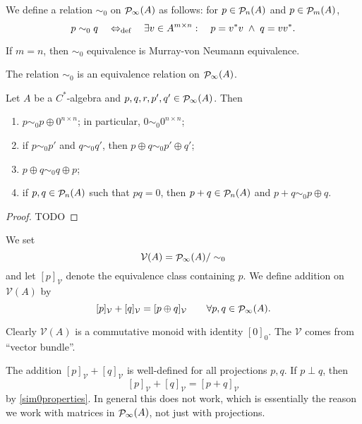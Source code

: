 \begin{definition}
We define a relation $\sim_0$ on $\mathop{\mathcal{P}}\nolimits_\infty(A)$ as follows: for $p\in \mathop{\mathcal{P}}\nolimits_n(A)$ and $p\in \mathop{\mathcal{P}}\nolimits_m(A)$,
\[ p \sim_0 q \quad\Leftrightarrow_{\text{def}}\quad \exists v\in A^{m\times n}: \quad p = v^*v\;\land \; q = vv^*. \]
\end{definition}
If $m=n$, then $\sim_0$ equivalence is Murray-von Neumann equivalence.
\begin{lemma}
The relation $\sim_0$ is an equivalence relation on $\mathop{\mathcal{P}}\nolimits_\infty(A)$.
\end{lemma}

\begin{lemma} \label{sim0properties}
Let $A$ be a $C^*$-algebra and $p,q,r,p',q'\in \mathop{\mathcal{P}}\nolimits_\infty(A)$. Then
\begin{enumerate}
\item $p\sim_0 p\oplus 0^{n\times n}$; in particular, $0 \sim_0 0^{n\times n}$;
\item if $p\sim_0 p'$ and $q\sim_0 q'$, then $p\oplus q \sim_0 p'\oplus q'$;
\item $p\oplus q \sim_0 q\oplus p$;
\item if $p,q\in\mathop{\mathcal{P}}\nolimits_n(A)$ such that $pq = 0$, then $p+q\in\mathop{\mathcal{P}}\nolimits_n(A)$ and $p+q \sim_0 p\oplus q$.
\end{enumerate}
\end{lemma}
\begin{proof}
TODO
\end{proof}

\begin{definition}
We set
\[ \mathcal{V}(A) = \mathop{\mathcal{P}}\nolimits_\infty(A) / \sim_0 \]
and let $[p]_\mathcal{V}$ denote the equivalence class containing $p$. We define addition on $\mathcal{V}(A)$ by
\[ [p]_\mathcal{V} + [q]_\mathcal{V} = [p\oplus q]_\mathcal{V} \qquad \forall p,q\in\mathop{\mathcal{P}}\nolimits_\infty(A). \]
\end{definition}
Clearly $\mathcal{V}(A)$ is a commutative monoid with identity $[0]_0$. The $\mathcal{V}$ comes from ``vector bundle''.

The addition $[p]_\mathcal{V} + [q]_\mathcal{V}$ is well-defined for all projections $p,q$. If $p\perp q$, then 
\[ [p]_\mathcal{V} + [q]_\mathcal{V} = [p+q]_\mathcal{V} \]
by \ref{sim0properties}. In general this does not work, which is essentially the reason we work with matrices in $\mathop{\mathcal{P}}\nolimits_\infty(A)$, not just with projections.

